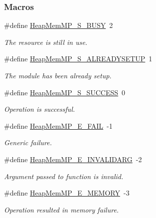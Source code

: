\subsubsection*{Macros}
\begin{DoxyCompactItemize}
\item 
\#define \hyperlink{_heap_mem_m_p_8h_a992f6b5e02a835e5a5116fe2f968bdfe}{Heap\-Mem\-M\-P\-\_\-\-S\-\_\-\-B\-U\-S\-Y}~2
\begin{DoxyCompactList}\small\item\em The resource is still in use. \end{DoxyCompactList}\item 
\#define \hyperlink{_heap_mem_m_p_8h_a62e81fa297f6eb3a9cbc154170fbd608}{Heap\-Mem\-M\-P\-\_\-\-S\-\_\-\-A\-L\-R\-E\-A\-D\-Y\-S\-E\-T\-U\-P}~1
\begin{DoxyCompactList}\small\item\em The module has been already setup. \end{DoxyCompactList}\item 
\#define \hyperlink{_heap_mem_m_p_8h_a220e8086edc8314cef6034e584b41c93}{Heap\-Mem\-M\-P\-\_\-\-S\-\_\-\-S\-U\-C\-C\-E\-S\-S}~0
\begin{DoxyCompactList}\small\item\em Operation is successful. \end{DoxyCompactList}\item 
\#define \hyperlink{_heap_mem_m_p_8h_a080d0886b807af624599a98987a4470b}{Heap\-Mem\-M\-P\-\_\-\-E\-\_\-\-F\-A\-I\-L}~-\/1
\begin{DoxyCompactList}\small\item\em Generic failure. \end{DoxyCompactList}\item 
\#define \hyperlink{_heap_mem_m_p_8h_ac9be05da1907e0e8d229ddba4d68af96}{Heap\-Mem\-M\-P\-\_\-\-E\-\_\-\-I\-N\-V\-A\-L\-I\-D\-A\-R\-G}~-\/2
\begin{DoxyCompactList}\small\item\em Argument passed to function is invalid. \end{DoxyCompactList}\item 
\#define \hyperlink{_heap_mem_m_p_8h_ae16b106a9e2b1d56da7aa7310d6b4fc6}{Heap\-Mem\-M\-P\-\_\-\-E\-\_\-\-M\-E\-M\-O\-R\-Y}~-\/3
\begin{DoxyCompactList}\small\item\em Operation resulted in memory failure. \end{DoxyCompactList}\item 

\end{DoxyCompactItemize}
